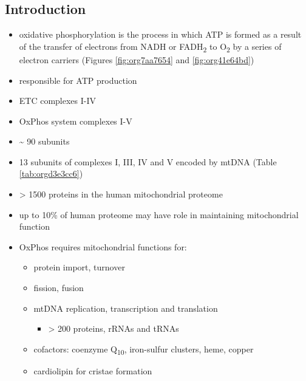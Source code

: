 \documentclass[12pt]{scrartcl}
\begin{document}
\subsection{Introduction}
\label{sec:orgb1b5319}
\begin{itemize}
\item oxidative phosphorylation is the process in which ATP is formed as a
result of the transfer of electrons from NADH or FADH\textsubscript{2} to O\textsubscript{2} by a
series of electron carriers (Figures \ref{fig:org7aa7654} and \ref{fig:org41e64bd})
\item responsible for ATP production
\item ETC complexes I-IV
\item OxPhos system complexes I-V
\item \textasciitilde{} 90 subunits
\item 13 subunits of complexes I, III, IV and V encoded by mtDNA (Table \ref{tab:orgd3e3cc6})
\item \textgreater{} 1500 proteins in the human mitochondrial proteome
\item up to 10\% of human proteome may have role in maintaining mitochondrial function
\item OxPhos requires mitochondrial functions for:
\begin{itemize}
\item protein import, turnover
\item fission, fusion
\item mtDNA replication, transcription and translation
\begin{itemize}
\item \textgreater{} 200 proteins, rRNAs and tRNAs
\end{itemize}
\item cofactors: coenzyme Q\textsubscript{10}, iron-sulfur clusters, heme, copper
\item cardiolipin for cristae formation
\end{itemize}


\end{itemize}
\end{document}
